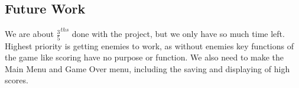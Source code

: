 \documentclass[10pt,conference,onecolumn,compsoc]{IEEEtran}
\begin{document}
\subsection{Future Work}
We are about $\frac{3}{5}^{ths}$ done with the project, but we only have so much time left. Highest priority is getting enemies to work, as without enemies key functions of the game like scoring have no purpose or function. We also need to make the Main Menu and Game Over menu, including the saving and displaying of high scores.





\end{document}
